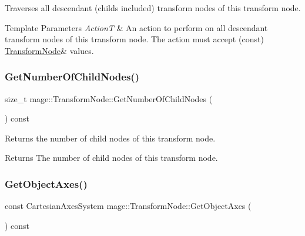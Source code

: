 Traverses all descendant (childs included) transform nodes of this transform node.


\begin{DoxyTemplParams}{Template Parameters}
{\em ActionT} & An action to perform on all descendant transform nodes of this transform node. The action must accept ({\ttfamily const}) {\ttfamily \hyperlink{classmage_1_1_transform_node}{Transform\+Node}\&} values. \\
\hline
\end{DoxyTemplParams}
\hypertarget{classmage_1_1_transform_node_a6d9c5c9f5ce1ee9ebf47bc7427f4fdd8}{}\label{classmage_1_1_transform_node_a6d9c5c9f5ce1ee9ebf47bc7427f4fdd8} 
\subsubsection{\texorpdfstring{Get\+Number\+Of\+Child\+Nodes()}{GetNumberOfChildNodes()}}
{\footnotesize\ttfamily size\+\_\+t mage\+::\+Transform\+Node\+::\+Get\+Number\+Of\+Child\+Nodes (\begin{DoxyParamCaption}{ }\end{DoxyParamCaption}) const\hspace{0.3cm}{\ttfamily [private]}}

Returns the number of child nodes of this transform node.

\begin{DoxyReturn}{Returns}
The number of child nodes of this transform node. 
\end{DoxyReturn}
\hypertarget{classmage_1_1_transform_node_aa6d5feb41f6e6d1582d26721ba537fdb}{}\label{classmage_1_1_transform_node_aa6d5feb41f6e6d1582d26721ba537fdb} 
\subsubsection{\texorpdfstring{Get\+Object\+Axes()}{GetObjectAxes()}}
{\footnotesize\ttfamily const Cartesian\+Axes\+System mage\+::\+Transform\+Node\+::\+Get\+Object\+Axes (\begin{DoxyParamCaption}{ }\end{DoxyParamCaption}) const}

